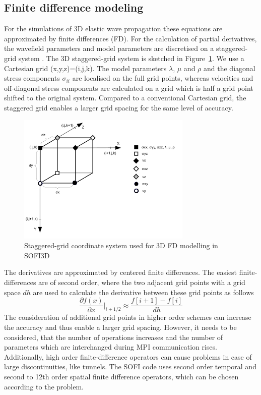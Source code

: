 \subsection{Finite difference modeling}\label{sec:FDmodeling}
For the simulations of 3D elastic wave propagation these equations are approximated by finite differences (FD). For the calculation of partial derivatives, the wavefield parameters and model parameters are discretised on a staggered-grid system \citep{Vir86, Lev88}. The 3D staggered-grid system is sketched in Figure~\ref{fig:stag_grid}. We use a Cartesian grid (x,y,z)=(i,j,k). The model parameters $\lambda$, $\mu$ and $\rho$ and the diagonal stress components $\sigma_{ii}$ are localised on the full grid points, whereas velocities and off-diagonal stress components are calculated on a grid which is half a grid point shifted to the original system. Compared to a conventional Cartesian grid, the staggered grid enables a larger grid spacing for the same level of accuracy.\\
\begin{figure}
\centering
\includegraphics[width=0.74\textwidth]{fig/ssg_grid}
\caption[Staggered grid system]{Staggered-grid coordinate system used for 3D FD modelling in SOFI3D}\label{fig:stag_grid}
\end{figure}
The derivatives are approximated by centered finite differences. The easiest finite-differences are of second order, where the two adjacent grid points with a grid space $dh$ are used to calculate the derivative between these grid points as follows
\begin{equation}
 \frac{\partial f(x)}{\partial x}|_{i+1/2}\approx \frac{f[i+1]-f[i]}{dh}
\end{equation}
 The consideration of additional grid points in higher order schemes can increase the accuracy and thus enable a larger grid spacing. However, it needs to be considered, that the number of operations increases and the number of parameters which are interchanged during MPI communication rises. Additionally, high order finite-difference operators can cause problems in case of large discontinuities, like tunnels. The SOFI code uses second order temporal and second to 12th order spatial finite difference operators, which can be chosen according to the problem.\\
